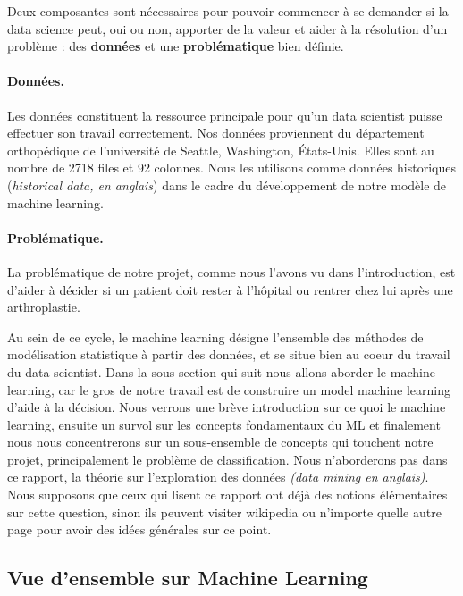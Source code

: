 \documentclass[12pt, french]{article}
\begin{document}
Deux composantes sont nécessaires pour pouvoir commencer à se demander si la data science peut, oui ou non, apporter de la valeur et aider à la résolution d'un problème : des \textbf{données} et une \textbf{problématique} bien définie.
\paragraph{Données.}
 Les données constituent la ressource principale pour qu'un data scientist puisse effectuer son travail correctement. Nos données proviennent du département orthopédique de l'université de Seattle, Washington, États-Unis. Elles sont au nombre de 2718 files et 92 colonnes. Nous les utilisons comme données historiques (\textit{historical data, en anglais}) dans le cadre du développement de notre modèle de machine learning. 
\paragraph{Problématique.}
La problématique de notre projet, comme nous l'avons vu dans l'introduction, est d'aider à décider si un patient doit rester à l'hôpital ou rentrer chez lui après une arthroplastie.  

Au sein de ce cycle, le machine learning désigne l'ensemble des méthodes de modélisation statistique à partir des données, et se situe bien au coeur du travail du data scientist. Dans la sous-section qui suit nous allons aborder le machine learning, car le gros de notre travail est de construire un model machine learning d'aide à la décision. Nous verrons une brève introduction sur ce quoi le machine learning, ensuite un survol sur les concepts fondamentaux du ML et finalement nous nous concentrerons sur un sous-ensemble de concepts qui touchent notre projet, principalement le problème de classification. Nous n'aborderons pas dans ce rapport, la théorie sur l'exploration des données \textit{(data mining en anglais)}. Nous supposons que ceux qui lisent ce rapport ont déjà des notions élémentaires sur cette question, sinon ils peuvent visiter wikipedia ou n'importe quelle autre page pour avoir des idées générales sur ce point.

\subsection{Vue d'ensemble sur Machine Learning}
\end{document}
